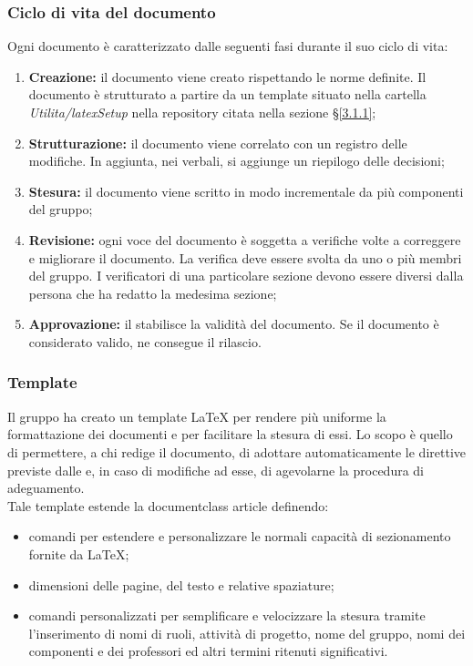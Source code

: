 \subsubsection{Ciclo di vita del documento}
Ogni documento è caratterizzato dalle seguenti fasi durante il suo ciclo di vita:
\begin{enumerate}
	\item \textbf{Creazione:} il documento viene creato rispettando le norme definite. Il documento è strutturato a partire da un template situato nella cartella \textit{Utilita/latexSetup} nella repository citata nella sezione §\ref{3.1.1};
	\item \textbf{Strutturazione:} il documento viene correlato con un registro delle modifiche. In aggiunta, nei verbali, si aggiunge un riepilogo delle decisioni;
	\item \textbf{Stesura:} il documento viene scritto in modo incrementale da più componenti del gruppo;
	\item \textbf{Revisione:} ogni voce del documento è soggetta a verifiche volte a correggere e migliorare il documento. La verifica deve essere svolta da uno o più membri del gruppo. I verificatori di una particolare sezione devono essere diversi dalla persona che ha redatto la medesima sezione;
	\item \textbf{Approvazione:} il \respProg{} stabilisce la validità del documento. Se il documento è considerato valido, ne consegue il rilascio.
\end{enumerate}

\subsubsection{Template}
Il gruppo ha creato un template \LaTeX{} per rendere più uniforme la formattazione dei documenti e per facilitare la stesura di essi. Lo scopo è quello di permettere, a chi redige il documento, di adottare automaticamente le direttive previste dalle \NdPv{} e, in caso di modifiche ad esse, di agevolarne la procedura di adeguamento. \\
Tale template estende la documentclass article definendo:
\begin{itemize}
	\item comandi per estendere e personalizzare le normali capacità di sezionamento fornite da \LaTeX ;
	\item dimensioni delle pagine, del testo e relative spaziature;
	\item comandi personalizzati per semplificare e velocizzare la stesura tramite l'inserimento di nomi di ruoli, attività di progetto, nome del gruppo, nomi dei componenti e dei professori ed altri termini ritenuti significativi. 
\end{itemize}










